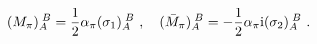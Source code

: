 \begin{equation}\label{masyflipped}
	 (M_\pi)_A^{\;B}=\frac{1}{2}\alpha_{\pi}(\sigma_1)_A^{\;B}\ ,\quad (\bar{M}_{\pi})_A^{\;B}=-\frac{1}{2}\alpha_{\pi}{\rm i}(\sigma_2)_A^{\;B}\ .
         \end{equation}

